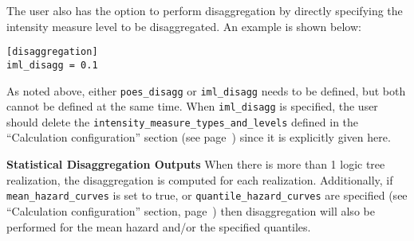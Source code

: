 The user also has the option to perform disaggregation by directly specifying the
intensity measure level to be disaggregated. An example is shown below:

\begin{verbatim}
[disaggregation]
iml_disagg = 0.1
\end{verbatim}

As noted above, either \texttt{poes\_disagg} or \texttt{iml\_disagg} needs
to be defined, but both cannot be defined at the same time. When
 \texttt{iml\_disagg} is specified, the user should delete the
 \texttt{intensity\_measure\_types\_and\_levels} defined in the
``Calculation configuration'' section (see page~\pageref{sec:calculation_configuration})
since it is explicitly given here.

\textbf{Statistical Disaggregation Outputs}
 When there is more than 1 logic tree realization, the disaggregation is
 computed for each realization. Additionally, if \texttt{mean\_hazard\_curves}
 is set to true, or \texttt{quantile\_hazard\_curves} are specified (see
 ``Calculation configuration'' section, page~\pageref{sec:calculation_configuration})
 then disaggregation will also be performed for the mean hazard and/or the
 specified quantiles.